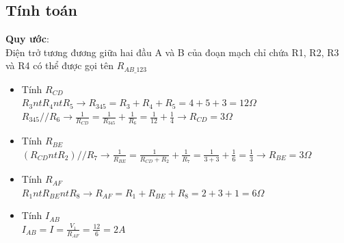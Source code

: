 \subsection{Tính toán}
\textbf{Quy ước}:\\
Điện trở tương đương giữa hai đầu A và B của đoạn mạch chỉ chứa R1, R2, R3 và R4 có thể được gọi tên \(R_{AB \_ 123}\)
\begin{itemize}
\item Tính \(R_{CD}\)\\\(R_3 nt R_4 nt R_5 \rightarrow R_{345} = R_3 + R_4 + R_5 = 4 + 5 + 3 = 12 \Omega\)\\ \(R_{345} // R_6 \rightarrow \frac{1}{R_{CD}} = \frac{1}{R_{345}} + \frac{1}{R_6} = \frac{1}{12} + \frac{1}{4} \rightarrow R_{CD} = 3 \Omega\)
\item Tính \(R_{BE}\)\\\((R_{CD} nt R_2)//R_7 \rightarrow \frac{1}{R_{BE}} = \frac{1}{R_{CD} + R_2} + \frac{1}{R_7} = \frac{1}{3 + 3} + \frac{1}{6} = \frac{1}{3} \rightarrow R_{BE} = 3 \Omega\)
\item Tính \(R_{AF}\)\\\(R_1 nt R_{BE} nt R_8 \rightarrow R_{AF} = R_1 + R_{BE} + R_8 = 2 + 3 + 1 = 6 \Omega\)
\item Tính \(I_{AB}\)\\\(I_{AB} = I = \frac{V_1}{R_{AF}} = \frac{12}{6} = 2 A\)
\end{itemize}
